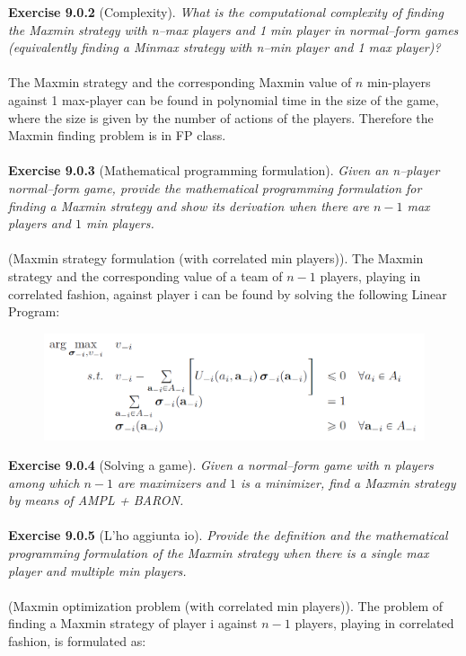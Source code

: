 \noindent
\textbf{Exercise 9.0.2} (Complexity). \textit{What is the computational complexity of finding the Maxmin strategy with n–max players and 1 min player in normal–form games (equivalently finding a Minmax strategy with n–min player and 1 max player)?}\\\\
The Maxmin strategy and the corresponding Maxmin value of $n$ min-players against 1 max-player can be found in polynomial time in the size of the game, where the size is given by the number of actions of the players. Therefore the Maxmin finding problem is in \textsf{FP} class.\\\\
\textbf{Exercise 9.0.3} (Mathematical programming formulation). \textit{Given an n–player normal–form game, provide the mathematical programming formulation for finding a Maxmin strategy and show its derivation when there are $ n-1 $ max players and $ 1 $ min players.}\\\\
(Maxmin strategy formulation (with correlated min players)). The Maxmin strategy and the corresponding value of a team of $n-1$ players, playing in correlated fashion, against player i can be found by solving the following Linear Program:
\begin{figure}[H]
\centering
\includegraphics[width=\textwidth]{images/img_2_9_03.png}
\end{figure}
\noindent
\textbf{Exercise 9.0.4} (Solving a game). \textit{Given a normal–form game with n players among which $ n-1 $ are maximizers and $ 1 $ is a minimizer, find a Maxmin strategy by means of AMPL + BARON.}\\\\
\textbf{Exercise 9.0.5} (L’ho aggiunta io). \textit{Provide the definition and the mathematical programming formulation of the Maxmin strategy when there is a single max player and multiple min players.}\\\\
(Maxmin optimization problem (with correlated min players)). The problem of finding a Maxmin strategy of player i against $n-1$ players, playing in correlated fashion, is formulated as:

